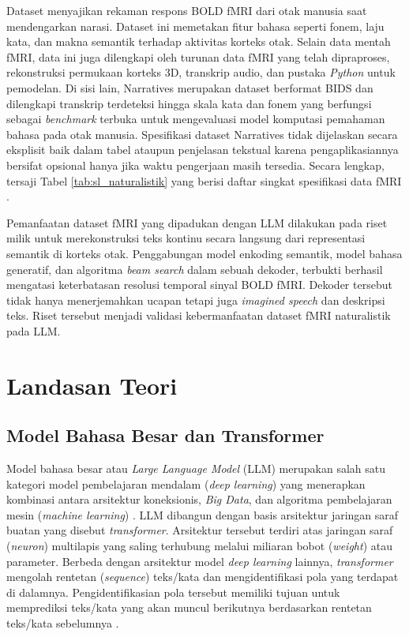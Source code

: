 Dataset \textcite{lebel2023natural} menyajikan rekaman respons BOLD fMRI dari otak manusia saat mendengarkan narasi. Dataset ini memetakan fitur bahasa seperti fonem, laju kata, dan makna semantik terhadap aktivitas korteks otak. Selain data mentah fMRI, data ini juga dilengkapi oleh turunan data fMRI yang telah dipraproses, rekonstruksi permukaan korteks 3D, transkrip audio, dan pustaka \textit{Python} untuk pemodelan. Di sisi lain, Narratives \autocite{nastase2021narratives} merupakan dataset berformat BIDS dan dilengkapi transkrip terdeteksi hingga skala kata dan fonem yang berfungsi sebagai \textit{benchmark} terbuka untuk mengevaluasi model komputasi pemahaman bahasa pada otak manusia. Spesifikasi dataset Narratives tidak dijelaskan secara eksplisit baik dalam tabel ataupun penjelasan tekstual karena pengaplikasiannya bersifat opsional hanya jika waktu pengerjaan masih tersedia. Secara lengkap, tersaji Tabel \ref{tab:sl_naturalistik} yang berisi daftar  singkat spesifikasi data fMRI \autocite{lebel2023natural}.



Pemanfaatan dataset fMRI yang dipadukan dengan LLM dilakukan pada riset milik \textcite{Tang2023858} untuk merekonstruksi teks kontinu secara langsung dari representasi semantik di korteks otak. Penggabungan model enkoding semantik, model bahasa generatif, dan algoritma \textit{beam search} dalam sebuah dekoder, terbukti berhasil mengatasi keterbatasan resolusi temporal sinyal BOLD fMRI. Dekoder tersebut tidak hanya menerjemahkan ucapan tetapi juga \textit{imagined speech} dan deskripsi teks. Riset tersebut menjadi validasi kebermanfaatan dataset fMRI naturalistik pada LLM.

\section{Landasan Teori}
\label{chap:sl_ldt}

\subsection{Model Bahasa Besar dan Transformer}
\label{sub:sl_llm}
Model bahasa besar atau \textit{Large Language Model} (LLM) merupakan salah satu kategori model pembelajaran mendalam (\textit{deep learning}) yang menerapkan kombinasi antara arsitektur koneksionis, \textit{Big Data}, dan algoritma pembelajaran mesin (\textit{machine learning}) \autocite{nefdt2026s}. LLM dibangun dengan basis arsitektur jaringan saraf buatan yang disebut \textit{transformer}. Arsitektur tersebut terdiri atas jaringan saraf (\textit{neuron}) multilapis yang saling terhubung melalui miliaran bobot (\textit{weight}) atau parameter. Berbeda dengan arsitektur model \textit{deep learning} lainnya, \textit{transformer} mengolah rentetan (\textit{sequence}) teks/kata dan mengidentifikasi pola yang terdapat di dalamnya. Pengidentifikasian pola tersebut memiliki tujuan untuk memprediksi teks/kata yang akan muncul berikutnya berdasarkan rentetan teks/kata sebelumnya \autocite{Stryker_2024}.

